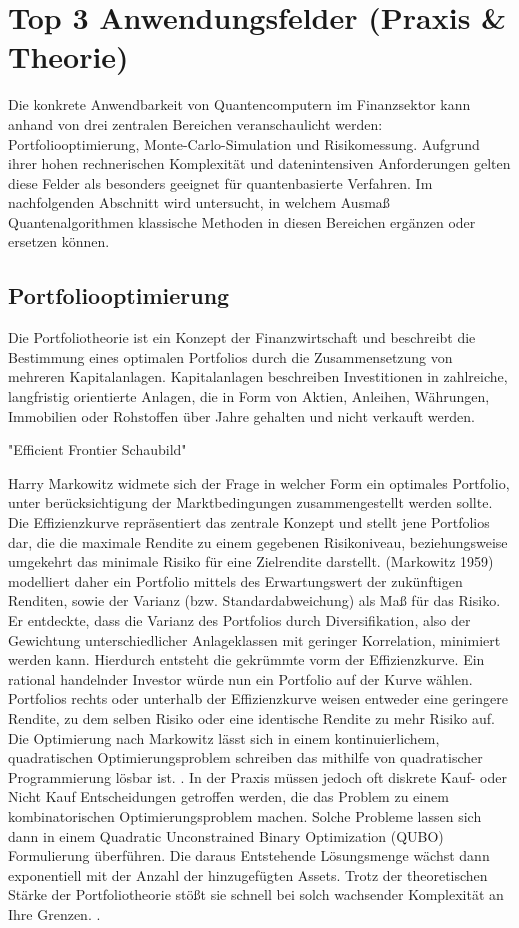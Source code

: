 \section{Top 3 Anwendungsfelder (Praxis \& Theorie)}
Die konkrete Anwendbarkeit von Quantencomputern im Finanzsektor kann anhand von drei zentralen Bereichen veranschaulicht werden: Portfoliooptimierung, Monte-Carlo-Simulation und Risikomessung. Aufgrund ihrer hohen rechnerischen Komplexität und datenintensiven Anforderungen gelten diese Felder als besonders geeignet für quantenbasierte Verfahren. Im nachfolgenden Abschnitt wird untersucht, in welchem Ausmaß Quantenalgorithmen klassische Methoden in diesen Bereichen ergänzen oder ersetzen können.

\subsection{Portfoliooptimierung}
Die Portfoliotheorie ist ein Konzept der Finanzwirtschaft und beschreibt die Bestimmung eines optimalen Portfolios durch die Zusammensetzung von mehreren Kapitalanlagen. Kapitalanlagen beschreiben Investitionen in zahlreiche, langfristig orientierte Anlagen, die in Form von Aktien, Anleihen, Währungen, Immobilien oder Rohstoffen über Jahre gehalten und nicht verkauft werden. 
\cite{orus2019,sakuler2025}

    "Efficient Frontier Schaubild"
 
Harry Markowitz widmete sich der Frage in welcher Form ein optimales Portfolio, unter berücksichtigung der Marktbedingungen zusammengestellt werden sollte. Die Effizienzkurve repräsentiert das zentrale Konzept und stellt jene Portfolios dar, die die maximale Rendite zu einem gegebenen Risikoniveau, beziehungsweise umgekehrt das minimale Risiko für eine Zielrendite darstellt. (Markowitz 1959) modelliert daher ein Portfolio mittels des Erwartungswert der zukünftigen Renditen, sowie der Varianz (bzw. Standardabweichung) als Maß für das Risiko. Er entdeckte, dass die Varianz des Portfolios durch Diversifikation, also der Gewichtung unterschiedlicher Anlageklassen mit geringer Korrelation, minimiert werden kann. Hierdurch entsteht die gekrümmte vorm der Effizienzkurve. Ein rational handelnder Investor würde nun ein Portfolio auf der Kurve wählen. Portfolios rechts oder unterhalb der Effizienzkurve weisen entweder eine geringere Rendite, zu dem selben Risiko oder eine identische Rendite zu mehr Risiko auf. 
Die Optimierung nach Markowitz lässt sich in einem kontinuierlichem, quadratischen Optimierungsproblem schreiben das mithilfe von quadratischer Programmierung lösbar ist. 
\cite{Sakuler et al., 2025, Orús u. a. 2019}.
In der Praxis müssen jedoch oft diskrete Kauf- oder Nicht Kauf Entscheidungen getroffen werden, die das Problem zu einem kombinatorischen Optimierungsproblem machen. Solche Probleme lassen sich dann in einem Quadratic Unconstrained Binary Optimization (QUBO) Formulierung überführen. Die daraus Entstehende Lösungsmenge wächst dann exponentiell mit der Anzahl der hinzugefügten Assets. 
Trotz der theoretischen Stärke der Portfoliotheorie stößt sie schnell bei solch wachsender Komplexität an Ihre Grenzen.
\cite{mondello2017,markowitz1959, Sakuler et al. 2025}.

